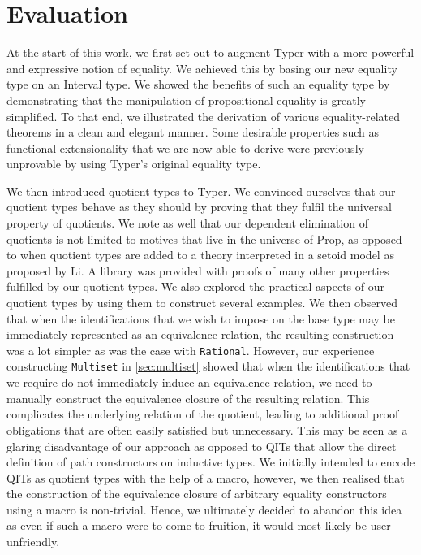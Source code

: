 \documentclass[12pt,twoside,maitrise]{dms}
\theoremstyle{definition}
\numberwithin{equation}{section}
\numberwithin{table}{chapter}
\numberwithin{figure}{chapter}
\newcommand\id[1] {\texttt{#1}}
\newcommand\type[1] {\textsf{#1}} %
\begin{document}
\chapter{Evaluation}

At the start of this work, we first set out to augment Typer with a more
powerful and expressive notion of equality. We achieved this by basing our new
equality type on an Interval type. We showed the benefits of such an equality
type by demonstrating that the manipulation of propositional equality is greatly
simplified. To that end, we illustrated the derivation of various
equality-related theorems in a clean and elegant manner. Some desirable
properties such as functional extensionality that we are now able to derive were
previously unprovable by using Typer's original equality type.

We then introduced quotient types to Typer. We convinced ourselves that our
quotient types behave as they should by proving that they fulfil the universal
property of quotients. We note as well that our dependent elimination of
quotients is not limited to motives that live in the universe of \type{Prop}, as
opposed to when quotient types are added to a theory interpreted in a setoid
model as proposed by Li\cite{li2015quotient}. A library was provided with proofs
of many other properties fulfilled by our quotient types. We also explored the
practical aspects of our quotient types by using them to construct several
examples. We then observed that when the identifications that we wish to impose
on the base type may be immediately represented as an equivalence relation, the
resulting construction was a lot simpler as was the case with \id{Rational}.
However, our experience constructing \id{Multiset} in \autoref{sec:multiset}
showed that when the identifications that we require do not immediately induce
an equivalence relation, we need to manually construct the equivalence closure
of the resulting relation. This complicates the underlying relation of the
quotient, leading to additional proof obligations that are often easily
satisfied but unnecessary. This may be seen as a glaring disadvantage of our
approach as opposed to QITs that allow the direct definition of path
constructors on inductive types. We initially intended to encode QITs as
quotient types with the help of a macro, however, we then realised that the
construction of the equivalence closure of arbitrary equality constructors using
a macro is non-trivial. Hence, we ultimately decided to abandon this idea as
even if such a macro were to come to fruition, it would most likely be
user-unfriendly.
\end{document}
